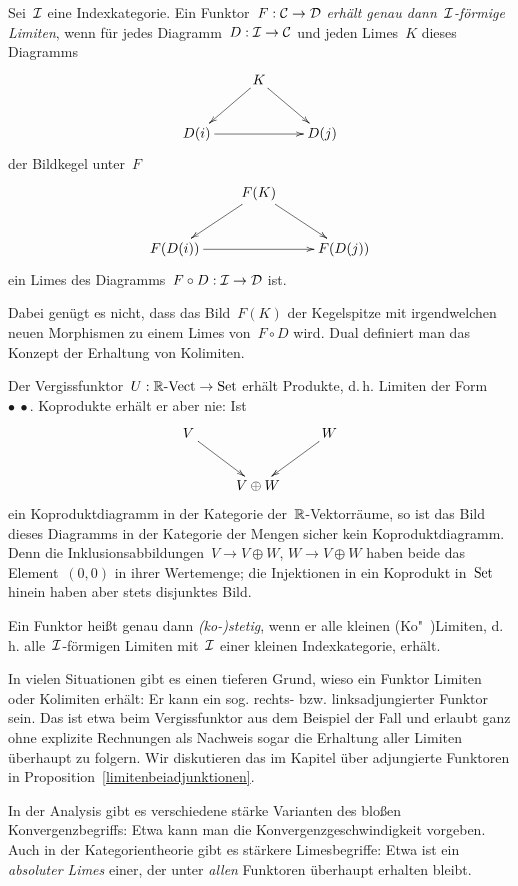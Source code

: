 \begin{defn}Sei~$\mathcal{I}$ eine Indexkategorie. Ein Funktor~$F:\mathcal{C}\to\mathcal{D}$ \emph{erhält
genau dann~$\mathcal{I}$-förmige Limiten}, wenn für jedes Diagramm~$D:\mathcal{I}\to\mathcal{C}$ und jeden
Limes~$K$ dieses Diagramms
\[ \xymatrix{
  & K \ar[ld] \ar[rd] \\
  D(i) \ar[rr] && D(j)
} \]
der Bildkegel unter~$F$
\[ \xymatrix{
  & F(K) \ar[ld] \ar[rd] \\
  F(D(i)) \ar[rr] && F(D(j))
} \]
ein Limes des Diagramms~$F \circ D : \mathcal{I} \to \mathcal{D}$ ist.
\end{defn}

Dabei genügt es nicht, dass das Bild~$F(K)$ der Kegelspitze mit irgendwelchen
neuen Morphismen zu einem Limes von~$F \circ D$ wird. Dual definiert man das
Konzept der Erhaltung von Kolimiten.

\begin{bsp}Der Vergissfunktor~$U : {\mathbb{R}\text{-}\mathrm{Vect}} \to \mathrm{Set}$ erhält Produkte, d.\,h.
Limiten der Form $\bullet\ \bullet$. Koprodukte erhält er aber nie: Ist
\[ \xymatrix{
  V \ar[rd] && W \ar[ld] \\
  & V \oplus W
} \]
ein Koproduktdiagramm in der Kategorie der~$\mathbb{R}$-Vektorräume, so ist das Bild
dieses Diagramms in der Kategorie der Mengen sicher kein Koproduktdiagramm.
Denn die Inklusionsabbildungen~$V \to V \oplus W$, $W \to V \oplus W$ haben
beide das Element~$(0,0)$ in ihrer Wertemenge; die Injektionen in ein
Koprodukt in~$\mathrm{Set}$ hinein haben aber stets disjunktes Bild.
\end{bsp}

\begin{defn}Ein Funktor heißt genau dann \emph{(ko-)stetig}, wenn er alle
kleinen (Ko"~)Li\-mi\-ten, d.\,h. alle~$\mathcal{I}$-förmigen Limiten mit~$\mathcal{I}$ einer kleinen
Indexkategorie, erhält.\end{defn}

In vielen Situationen gibt es einen tieferen Grund, wieso ein Funktor Limiten
oder Kolimiten erhält: Er kann ein sog. rechts- bzw. linksadjungierter Funktor
sein. Das ist etwa beim Vergissfunktor aus dem Beispiel der Fall und erlaubt
ganz ohne explizite Rechnungen als Nachweis sogar die Erhaltung aller Limiten
überhaupt zu folgern.  Wir diskutieren das im Kapitel über adjungierte
Funktoren in Proposition~\ref{limitenbeiadjunktionen}.

\begin{bem}In der Analysis gibt es verschiedene stärke Varianten des bloßen
Konvergenzbegriffs: Etwa kann man die Konvergenzgeschwindigkeit vorgeben.
Auch in der Kategorientheorie gibt es stärkere Limesbegriffe: Etwa ist ein
\emph{absoluter Limes} einer, der unter \emph{allen} Funktoren überhaupt
erhalten bleibt.\end{bem}


